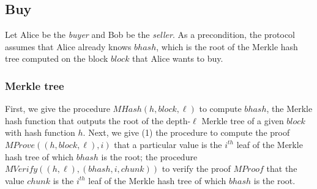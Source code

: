 \newcommand{\myvar}[1]{{{\mathit{#1}}}}
\newcommand{\block}{\myvar{block}}
\newcommand{\chunks}{\myvar{chunk}}
\newcommand{\proofs}{\myvar{proof}}
\newcommand{\ctext}{\myvar{ctext}}
\newcommand{\chash}{\myvar{chash}}
\newcommand{\bhash}{\myvar{bhash}}
\newcommand{\comm}{\myvar{comm}}
\newcommand{\coinp}{\ensuremath{\mathit{coin}'}\xspace}
\newcommand{\timeout}{\myvar{timeout}}
\newcommand{\mendorsement}{\myvar{endorsement}}
\newcommand{\data}{\myvar{data}}
\newcommand{\contract}{\myvar{contract}}
\newcommand{\contractp}{\myvar{contract}'}
\newcommand{\escrow}{\myvar{escrow}}
\newcommand{\database}{\myvar{DB}}
\newcommand{\mproof}{\myvar{MProof}}
\newcommand{\merkle}{\myvar{MHash}}
\newcommand{\merkProve}{\myvar{MProve}}
\newcommand{\merkproof}{\myvar{MProof}}
\newcommand{\merkVer}{\myvar{MVerify}}
\newcommand{\chunk}{\myvar{chunk}}
\newcommand{\ignore}[1]{}


\newcommand{\skAlice}{\ensuremath{sk_{\mathcal{A}}}}
\newcommand{\pkAlice}{\ensuremath{pk_{\mathcal{A}}}}
\newcommand{\pkBob}{\ensuremath{pk_{\mathcal{B}}}}
\newcommand{\skBob}{\ensuremath{sk_{\mathcal{B}}}}
\newcommand{\pkTTP}{\ensuremath{pk_{Arbiter}}}

\subsection{Buy}
Let Alice be the \emph{buyer} and Bob be the \emph{seller}.
As a precondition, the
protocol assumes that Alice already knows $\bhash$, which is the root of the Merkle hash tree computed on the block $\block$ that Alice wants to buy.

\subsubsection{Merkle tree}
First, we give the procedure $\merkle(h,\block,\ell)$ to compute
$\bhash$, the Merkle hash function that outputs the root of the
depth-$\ell$ Merkle tree of a given $\block$ with hash function $h$.
Next, we give (1) the procedure to compute the proof
$\merkProve((h,\block,\ell),i)$ that a particular value 
is the $i^\mathit{th}$ leaf of the Merkle hash tree of which
$\bhash$ is the root; the procedure 
$\merkVer((h,\ell),(\bhash,i,\chunk))$ to verify the proof $\mproof$ that
 the value
$\chunk$ is the $i^\mathit{th}$ leaf of the Merkle hash tree of which
$\bhash$ is the root.


